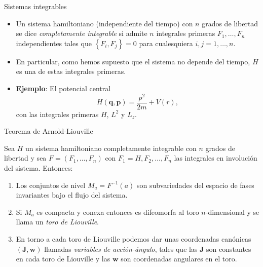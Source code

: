 \documentclass[aspectratio=169,mathserif]{beamer}
\newcommand{\vect}[1]{\mathbf{#1}}
\begin{document}
\begin{frame}{Sistemas integrables}
  \begin{itemize}
    \item Un sistema hamiltoniano (independiente del tiempo) con $n$ grados de libertad se dice \emph{completamente integrable} si admite $n$ integrales primeras $F_1,\dots,F_n$ independientes tales que $\left\{ F_i, F_j \right\}=0$ para cualesquiera $i,j=1,\dots,n$.
    \pause
    \item En particular, como hemos supuesto que el sistema no depende del tiempo, $H$ es una de estas integrales primeras.
    \pause
    \item \textbf{Ejemplo}: El potencial central
      \begin{equation*}
	H(\vect{q},\vect{p})=\frac{p^2}{2m}+V(r),
      \end{equation*}
      con las integrales primeras $H$, $L^2$ y $L_z$.
  \end{itemize}
\end{frame}

\begin{frame}{Teorema de Arnold-Liouville}
  \begin{theorem}
    Sea $H$ un sistema hamiltoniano completamente integrable con $n$ grados de libertad y sea $F=(F_1,\dots,F_n)$ con $F_1=H,F_2,\dots,F_n$ las integrales en involución del sistema. Entonces:
    \pause
    \begin{enumerate}
      \item Los conjuntos de nivel $M_a=F^{-1}(a)$ son subvariedades del espacio de fases invariantes bajo el flujo del sistema.
    \pause
      \item Si $M_a$ es compacta y conexa entonces es difeomorfa al toro $n$-dimensional y se llama un \emph{toro de Liouville}.
    \pause
      \item En torno a cada toro de Liouville podemos dar unas coordenadas canónicas $(\vect{J},\vect{w})$ llamadas \emph{variables de acción-ángulo}, tales que las $\vect{J}$ son constantes en cada toro de Liouville y las $\vect{w}$ son coordenadas angulares en el toro. 
    \end{enumerate}
  \end{theorem}
\end{frame}
\end{document}
